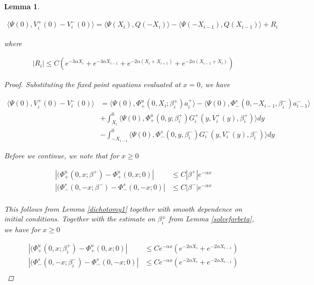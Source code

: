 \documentclass[12pt]{article}
\newtheorem{lemma}{Lemma}
\begin{document}
\begin{lemma}\label{jumplemma1}

\begin{align*}
\langle \Psi(0), V_i^+(0) - V_i^-(0) \rangle = 
\langle \Psi(X_i), Q(-X_i) \rangle - \langle \Psi(-X_{i-1}), Q(X_{i-1}) \rangle + R_i
\end{align*}

where 

\begin{align*}
|R_i| \leq C ( e^{-3 \alpha X_i} +  e^{-3 \alpha X_{i-1}}
+ e^{-2 \alpha (X_i + X_{i+1})} + e^{-2 \alpha (X_{i-1} + X_i)})
\end{align*}

\begin{proof}

Substituting the fixed point equations evaluated at $x = 0$, we have

\begin{align*}
\langle \Psi(0), V_i^+(0) - V_i^-(0) \rangle &= \langle \Psi(0), \Phi^u_+(0, X_i; \beta_i^+) a_i^+ \rangle
- \langle \Psi(0), \Phi^s_-(0, -X_{i-1}, \beta_i^-) a_{i-1}^- \rangle \\
&+ \int_{X_i}^0 \langle \Psi(0), \Phi_+^u(0, y; \beta_i^+) G_i^+(y, V_i^+(y),\beta_i^+) \rangle dy \\
&- \int_{-X_{i-1}}^0 \langle \Psi(0), \Phi_-^s(0, y, \beta_i^-) G_i^-(y, V_i^-(y),\beta_i^-) \rangle dy
\end{align*}

Before we continue, we note that for $x \geq 0$

\begin{align*}
|(\Phi_+^u(0, x; \beta^+) - \Phi_+^u(0, x; 0)| &\leq C |\beta^+| e^{-\alpha x} \\
|(\Phi_-^s(0, -x; \beta^-) - \Phi_-^s(0, -x; 0)| &\leq C |\beta^-| e^{-\alpha x} \\
\end{align*}

This follows from Lemma \ref{dichotomy1} together with smooth dependence on initial conditions. Together with the estimate on $\beta_i^\pm$ from Lemma \ref{solveforbeta}, we have for $x \geq 0$

\begin{align*}
|(\Phi_+^u(0, x; \beta_i^+) - \Phi_+^u(0, x; 0)| &\leq C e^{-\alpha x} (e^{-2 \alpha X_i} + e^{-2 \alpha X_{i-1}})\\
|(\Phi_-^s(0, -x; \beta_i^-) - \Phi_-^s(0, -x; 0)| &\leq C e^{-\alpha x} (e^{-2 \alpha X_i} + e^{-2 \alpha X_{i-1}}) \\
\end{align*}


\end{proof}
\end{lemma}
\end{document}
